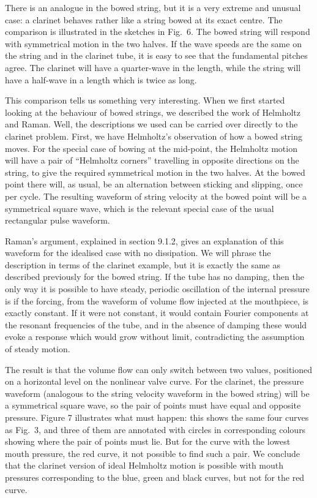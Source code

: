   There is an analogue in the bowed string, but it is a very extreme and 
  unusual case: a clarinet behaves rather like a string bowed at its exact 
  centre. The comparison is illustrated in the sketches in Fig.\ 6. The bowed 
  string will respond with symmetrical motion in the two halves. If the wave 
  speeds are the same on the string and in the clarinet tube, it is easy to see 
  that the fundamental pitches agree. The clarinet will have a quarter-wave in 
  the length, while the string will have a half-wave in a length which is twice 
  as long. 


  This comparison tells us something very interesting. When we first started 
  looking at the behaviour of bowed strings, we described the work of Helmholtz 
  and Raman. Well, the descriptions we used can be carried over directly to the 
  clarinet problem. First, we have Helmholtz’s observation of how a bowed 
  string moves. For the special case of bowing at the mid-point, the Helmholtz 
  motion will have a pair of “Helmholtz corners” travelling in opposite 
  directions on the string, to give the required symmetrical motion in the two 
  halves. At the bowed point there will, as usual, be an alternation between 
  sticking and slipping, once per cycle. The resulting waveform of string 
  velocity at the bowed point will be a symmetrical square wave, which is the 
  relevant special case of the usual rectangular pulse waveform. 

  Raman’s argument, explained in section 9.1.2, gives an explanation of this 
  waveform for the idealised case with no dissipation. We will phrase the 
  description in terms of the clarinet example, but it is exactly the same as 
  described previously for the bowed string. If the tube has no damping, then 
  the only way it is possible to have steady, periodic oscillation of the 
  internal pressure is if the forcing, from the waveform of volume flow 
  injected at the mouthpiece, is exactly constant. If it were not constant, it 
  would contain Fourier components at the resonant frequencies of the tube, and 
  in the absence of damping these would evoke a response which would grow 
  without limit, contradicting the assumption of steady motion. 

  The result is that the volume flow can only switch between two values, 
  positioned on a horizontal level on the nonlinear valve curve. For the 
  clarinet, the pressure waveform (analogous to the string velocity waveform in 
  the bowed string) will be a symmetrical square wave, so the pair of points 
  must have equal and opposite pressure. Figure 7 illustrates what must happen: 
  this shows the same four curves as Fig.\ 3, and three of them are annotated 
  with circles in corresponding colours showing where the pair of points must 
  lie. But for the curve with the lowest mouth pressure, the red curve, it not 
  possible to find such a pair. We conclude that the clarinet version of ideal 
  Helmholtz motion is possible with mouth pressures corresponding to the blue, 
  green and black curves, but not for the red curve. 

